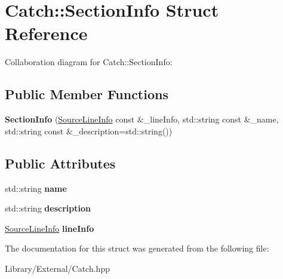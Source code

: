 \hypertarget{struct_catch_1_1_section_info}{}\section{Catch\+:\+:Section\+Info Struct Reference}
\label{struct_catch_1_1_section_info}


Collaboration diagram for Catch\+:\+:Section\+Info\+:
\subsection*{Public Member Functions}
\begin{DoxyCompactItemize}
\item 
\hypertarget{struct_catch_1_1_section_info_a27aff3aaf8b6611f3651b17111a272c6}{}{\bfseries Section\+Info} (\hyperlink{struct_catch_1_1_source_line_info}{Source\+Line\+Info} const \&\+\_\+line\+Info, std\+::string const \&\+\_\+name, std\+::string const \&\+\_\+description=std\+::string())\label{struct_catch_1_1_section_info_a27aff3aaf8b6611f3651b17111a272c6}

\end{DoxyCompactItemize}
\subsection*{Public Attributes}
\begin{DoxyCompactItemize}
\item 
\hypertarget{struct_catch_1_1_section_info_a704c8fc662d309137e0d4f199cb7df58}{}std\+::string {\bfseries name}\label{struct_catch_1_1_section_info_a704c8fc662d309137e0d4f199cb7df58}

\item 
\hypertarget{struct_catch_1_1_section_info_a0052060219a6de74bb7ade34d4163a4e}{}std\+::string {\bfseries description}\label{struct_catch_1_1_section_info_a0052060219a6de74bb7ade34d4163a4e}

\item 
\hypertarget{struct_catch_1_1_section_info_adbc83b8a3507c4acc8ee249e93465711}{}\hyperlink{struct_catch_1_1_source_line_info}{Source\+Line\+Info} {\bfseries line\+Info}\label{struct_catch_1_1_section_info_adbc83b8a3507c4acc8ee249e93465711}

\end{DoxyCompactItemize}


The documentation for this struct was generated from the following file\+:\begin{DoxyCompactItemize}
\item 
Library/\+External/Catch.\+hpp\end{DoxyCompactItemize}
